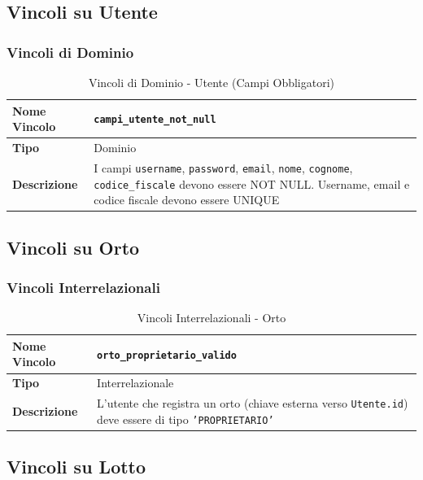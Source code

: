 \documentclass[12pt,a4paper]{article}
\begin{document}
\subsection{Vincoli su Utente}

\subsubsection{Vincoli di Dominio}

\begin{table}[H]
\centering
\caption{Vincoli di Dominio - Utente (Campi Obbligatori)}
\begin{tabularx}{\textwidth}{|l|X|}
\hline
\textbf{Nome Vincolo} & \texttt{campi\_utente\_not\_null} \\
\hline
\textbf{Tipo} & Dominio \\
\hline
\textbf{Descrizione} & I campi \texttt{username}, \texttt{password}, \texttt{email}, \texttt{nome}, \texttt{cognome}, \texttt{codice\_fiscale} devono essere NOT NULL. Username, email e codice fiscale devono essere UNIQUE \\
\hline
\end{tabularx}
\end{table}

\subsection{Vincoli su Orto}

\subsubsection{Vincoli Interrelazionali}

\begin{table}[H]
\centering
\caption{Vincoli Interrelazionali - Orto}
\begin{tabularx}{\textwidth}{|l|X|}
\hline
\textbf{Nome Vincolo} & \texttt{orto\_proprietario\_valido} \\
\hline
\textbf{Tipo} & Interrelazionale \\
\hline
\textbf{Descrizione} & L'utente che registra un orto (chiave esterna verso \texttt{Utente.id}) deve essere di tipo \texttt{'PROPRIETARIO'} \\
\hline
\end{tabularx}
\end{table}

\subsection{Vincoli su Lotto}
\end{document}
